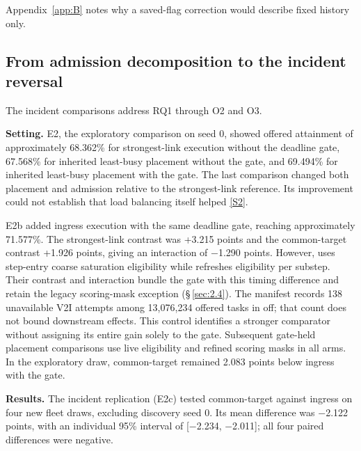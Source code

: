 \documentclass[12pt,a4paper]{article}
\begin{document}
Appendix~\ref{app:B} notes why a saved-flag correction would describe fixed history only.

\FloatBarrier
\subsection{From admission decomposition to the incident reversal}\label{sec:3.2}

The incident comparisons address RQ1 through O2 and O3.

\textbf{Setting.} E2, the exploratory comparison on seed 0, showed offered attainment of approximately 68.362\% for strongest-link execution without the deadline gate, 67.568\% for inherited least-busy placement without the gate, and 69.494\% for inherited least-busy placement with the gate. The last comparison changed both placement and admission relative to the strongest-link reference. Its improvement could not establish that load balancing itself helped \hyperref[source-s2]{[S2]}.

E2b added ingress execution with the same deadline gate, reaching approximately 71.577\%. The strongest-link contrast was +3.215 points and the common-target contrast +1.926 points, giving an interaction of \ensuremath{-}1.290 points. However,  uses step-entry coarse saturation eligibility while  refreshes eligibility per substep. Their contrast and interaction bundle the gate with this timing difference and retain the legacy scoring-mask exception (\S\,\ref{sec:2.4}). The manifest records 138 unavailable V2I attempts among 13,076,234 offered tasks in off; that count does not bound downstream effects. This control identifies a stronger comparator without assigning its entire gain solely to the gate. Subsequent gate-held placement comparisons use live eligibility and refined scoring masks in all arms. In the exploratory draw, common-target remained 2.083 points below ingress with the gate.

\textbf{Results.} The incident replication (E2c) tested common-target against ingress on four new fleet draws, excluding discovery seed 0. Its mean difference was \ensuremath{-}2.122 points, with an individual 95\% interval of [\ensuremath{-}2.234, \ensuremath{-}2.011]; all four paired differences were negative.
\end{document}

